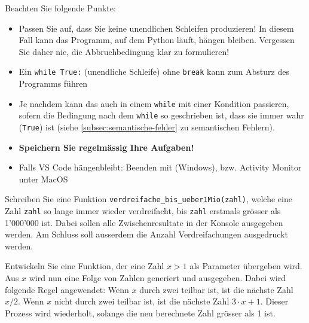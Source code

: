 \begin{myattention}
	Beachten Sie folgende Punkte:
	\begin{itemize}
		\item Passen Sie auf, dass Sie keine unendlichen Schleifen produzieren! In diesem Fall kann das Programm, auf dem Python läuft, hängen bleiben. Vergessen Sie daher nie, die Abbruchbedingung klar zu formulieren!
		\item Ein \lstinline|while True:| (unendliche Schleife) ohne \lstinline|break| kann zum Absturz des Programms führen 
		\item Je nachdem kann das auch in einem \lstinline|while| mit einer Kondition passieren, sofern die Bedingung nach dem \lstinline|while| so geschrieben ist, dass sie immer wahr (\lstinline|True|) ist (siehe \cref{subsec:semantische-fehler} zu semantischen Fehlern).
		\item \textbf{Speichern Sie regelmässig Ihre Aufgaben!}
		\item Falls VS Code hängenbleibt: Beenden mit  (Windows), bzw. Activity Monitor unter MacOS
	\end{itemize}
\end{myattention}

\begin{myexercise}
	Schreiben Sie eine Funktion \lstinline|verdreifache_bis_ueber1Mio(zahl)|, welche eine Zahl \texttt{zahl} so lange immer wieder verdreifacht, bis \texttt{zahl} erstmals grösser als 1'000'000 ist. Dabei sollen alle Zwischenresultate in der Konsole ausgegeben werden. Am Schluss soll ausserdem die Anzahl Verdreifachungen ausgedruckt werden.
	\begin{myanswer}
		
	\end{myanswer}
\end{myexercise}

\begin{myexercise}
	Entwickeln Sie eine Funktion, der eine Zahl $x > 1$ als Parameter übergeben wird. Aus $x$ wird nun eine Folge von Zahlen generiert und ausgegeben. Dabei wird folgende Regel angewendet: Wenn $x$ durch zwei teilbar ist, ist die nächste Zahl $x / 2$. Wenn $x$ nicht durch zwei teilbar ist, ist die nächste Zahl $3 \cdot x + 1$. Dieser Prozess wird wiederholt, solange die neu berechnete Zahl grösser als 1 ist.
	\begin{myanswer}
		
	\end{myanswer}
\end{myexercise}

